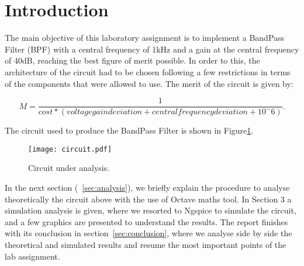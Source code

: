 \section{Introduction}
\label{sec:introduction}

\par The main objective of this laboratory assignment is to implement a BandPass Filter (BPF) with a central frequency of 1kHz and a gain at the central frequency of 40dB, reaching the best figure of merit possible. In order to this, the architecture of the circuit had to be chosen following a few restrictions in terms of the components that were allowed to use. The merit of the circuit is given by:

\begin{equation}
  M = \frac {1}{cost * (voltage gain deviation + central frequency deviation + 10^-6)}.
  \label{eq:merit}
\end{equation}


\par The circuit used to produce the BandPass Filter is shown in Figure\ref{fig:circuit}.

\begin{figure}[h] \centering
\texttt{[image: circuit.pdf]}
\caption{Circuit under analysis.}
\label{fig:circuit}
\end{figure}


\par In the next section (~\ref{sec:analysis}), we briefly explain the procedure to analyse theoretically the circuit above with the use of Octave maths tool. In Section 3 a simulation analysis is given, where we resorted to Ngspice to simulate the circuit, and a few graphics are presented to understand the results. The report finishes with its conclusion in section~\ref{sec:conclusion}, where we analyse side by side the theoretical and simulated results and resume the most important points of the lab assignment.

\newpage
